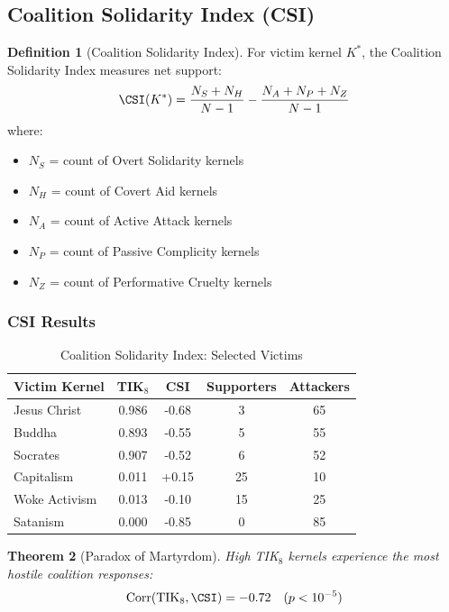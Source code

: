 \documentclass[11pt,a4paper]{article}
\newtheorem{theorem}{Theorem}[section]
\theoremstyle{definition}
\newtheorem{definition}[theorem]{Definition}
\theoremstyle{remark}
\newcommand{\TIKeight}{\text{TIK}_8}
\DeclareMathOperator{\Corr}{Corr}
\begin{document}
\subsection{Coalition Solidarity Index (CSI)}

\begin{definition}[Coalition Solidarity Index]
\label{def:csi}
For victim kernel $K^*$, the Coalition Solidarity Index measures net support:
\begin{equation}
    \CSI(K^*) = \frac{N_S + N_H}{N-1} - \frac{N_A + N_P + N_Z}{N-1}
    \label{eq:csi}
\end{equation}
where:
\begin{itemize}
    \item $N_S$ = count of Overt Solidarity kernels
    \item $N_H$ = count of Covert Aid kernels
    \item $N_A$ = count of Active Attack kernels
    \item $N_P$ = count of Passive Complicity kernels
    \item $N_Z$ = count of Performative Cruelty kernels
\end{itemize}
\end{definition}

\subsubsection{CSI Results}

\begin{table}[H]
\centering
\caption{Coalition Solidarity Index: Selected Victims}
\label{tab:csi-results}
\begin{tabular}{@{}lcccc@{}}
\toprule
\textbf{Victim Kernel} & \textbf{TIK$_8$} & \textbf{CSI} & \textbf{Supporters} & \textbf{Attackers} \\
\midrule
Jesus Christ & 0.986 & -0.68 & 3 & 65 \\
Buddha & 0.893 & -0.55 & 5 & 55 \\
Socrates & 0.907 & -0.52 & 6 & 52 \\
Capitalism & 0.011 & +0.15 & 25 & 10 \\
Woke Activism & 0.013 & -0.10 & 15 & 25 \\
Satanism & 0.000 & -0.85 & 0 & 85 \\
\bottomrule
\end{tabular}
\end{table}

\begin{theorem}[Paradox of Martyrdom]
\label{thm:martyrdom-paradox}
High TIK$_8$ kernels experience the most hostile coalition responses:
\begin{equation}
    \Corr(\TIKeight, \CSI) = -0.72 \quad (p < 10^{-5})
    \label{eq:martyrdom-paradox}
\end{equation}
\end{theorem}
\end{document}
